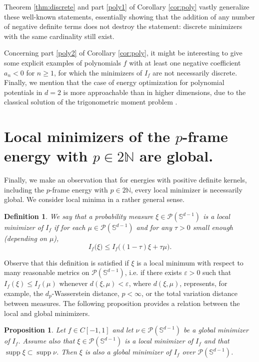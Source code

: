\documentclass[11pt, leqno]{amsart}
\def\N{\mathbb N}
\def\S{\mathbb S}
\def\supp{\operatorname{supp}}
\newtheorem{proposition}[theorem]{Proposition}
\newtheorem{definition}[theorem]{Definition}
\theoremstyle{definition}
\numberwithin{equation}{section}
\begin{document}
Theorem \ref{thm:discrete} and part \eqref{poly1} of Corollary \ref{cor:poly} vastly generalize these well-known statements, essentially showing that the addition of  any number of negative definite terms does not destroy the statement: discrete minimizers with the same cardinality still exist. 

Concerning part \eqref{poly2} of Corollary \ref{cor:poly}, it might be interesting to give some explicit examples of polynomials $f$ with at least one negative coefficient $a_n<0$ for $n\ge 1$, for which the minimizers of $I_f$ are not necessarily discrete. Finally, we mention that the case of energy optimization for polynomial potentials in $d=2$ is more approachable than in higher dimensions, due to the classical solution of the trigonometric moment problem \cite[Theorem 1.4]{shohattam}.


\section{Local minimizers of the $p$-frame energy with $p\in 2\N$ are global.}\label{sec:locglob} 



Finally, we make an observation that for energies with positive definite kernels, including the $p$-frame energy with $p\in 2 \N$, every local minimizer is necessarily global. We consider local minima in a rather general sense. 
\begin{definition}
We say that a probability measure  $\xi \in \mathcal P (\S^{d-1})$ is a local minimizer of $I_f$ if for each $\mu \in \mathcal P ( \S^{d-1})$ and for any $\tau>0$ small enough (depending on $\mu$), $$ I_f \big( \xi \big) \le  I_f \big( (1-\tau) \xi + \tau \mu  \big). $$
\end{definition}

Observe that this definition is satisfied if $\xi$ is a local minimum with respect to many reasonable metrics on $\mathcal P (\S^{d-1})$, i.e. if there exists $\varepsilon >0$ such that $I_f (\xi ) \le I_f (\mu)$ whenever $ d( \xi, \mu ) <\varepsilon$, where $d(\xi, \mu)$,  represents, for example,  the $d_p$-Wasserstein distance, $p<\infty$, or the total variation distance between measures.  The following proposition provides a relation between the local and global minimizers. 

\begin{proposition}\label{p:locglob}
Let $ f\in C[-1,1]$ and let $\nu \in \mathcal P (\S^{d-1})$ be a global minimizer of $I_f$. Assume also that $\xi \in \mathcal P (\S^{d-1})$ is a local minimizer of $I_f$ and that $\supp \xi \subset \supp \nu$. Then $\xi$ is also a global minimizer of $I_f$ over $\mathcal P (\S^{d-1})$.
\end{proposition}
\end{document}
